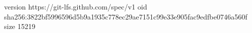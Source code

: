 version https://git-lfs.github.com/spec/v1
oid sha256:3822bf5996596d5b9a1935c778ec29ae7151c99e33e905fac9edfbe0746a560f
size 15219
